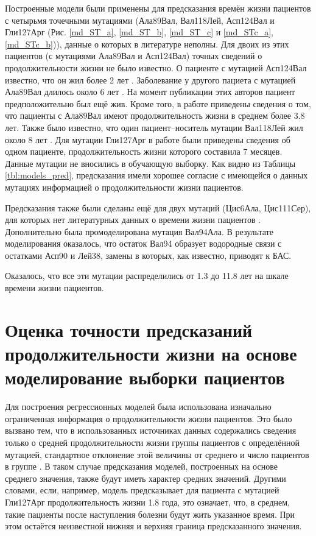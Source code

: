 Построенные модели были применены для предсказания времён жизни пациентов с четырьмя точечными мутациями (Ала89Вал, Вал118Лей, Асп124Вал и Гли127Арг (Рис.  \ref{md_ST_a}, \ref{md_ST_b}, \ref{md_ST_c} и \ref{md_STc_a}, \ref{md_STc_b})), данные о которых в литературе неполны. Для двоих из этих пациентов (с мутациями Ала89Вал и Асп124Вал) точных сведений о продолжительности жизни не было известно. О пациенте с мутацией Асп124Вал известно, что он жил более 2 лет \cite{Wang2008}. Заболевание у другого пациета с мутацией Ала89Вал длилось около 6 лет \cite{Sato2005}. На момент публикации этих авторов пациент предположительно был ещё жив. Кроме того, в работе \cite{Wang2008} приведены сведения о том, что пациенты с Ала89Вал имеют продолжительность жизни в среднем более 3.8 лет. Также было известно, что один пациент--носитель мутации Вал118Лей жил около 8 лет \cite{Shimizu2000}. Для мутации Гли127Арг в работе \cite{Holmoy2010} были приведены сведения об одном пациенте, продолжительность жизни которого составила 7 месяцев. Данные мутации не вносились в обучающую выборку. Как видно из Таблицы \ref{tbl:models_pred}, предсказания имели хорошее согласие с имеющейся о данных мутациях информацией о продолжительности жизни пациентов.

Предсказания также были сделаны ещё для двух мутаций (Цис6Ала, Цис111Сер), для которых нет литературных данных о времени жизни пациентов \cite{Lepock1990}.
Дополнительно была промоделирована мутация Вал94Ала. В результате моделирования оказалось, что остаток Вал94 образует водородные связи с остатками Асп90 и Лей38, замены в которых, как известно, приводят к БАС.

Оказалось, что все эти мутации распределились от 1.3 до 11.8 лет на шкале времени жизни пациентов.

\section{Оценка точности предсказаний продолжительности жизни на основе моделирование выборки пациентов} \label{sect_MD_crossvalidation}

Для построения регрессионных моделей была использована изначально ограниченная информация о продолжительности жизни пациентов. Это было вызвано тем, что в использованных источниках данных содержались сведения только о средней продолжительности жизни группы пациентов с определённой мутацией, стандартное отклонение этой величины от среднего и число пациентов в группе \cite{Wang2008}. В таком случае предсказания моделей, построенных на основе среднего значения, также будут иметь характер средних значений. Другими словами, если, например, модель \modelpphb{} предсказывает для пациента с мутацией Гли127Арг продолжительность жизни 1.8 года, это означает, что, в среднем, такие пациенты после наступления болезни будут жить указанное время. При этом остаётся неизвестной нижняя и верхняя граница предсказанного значения.

